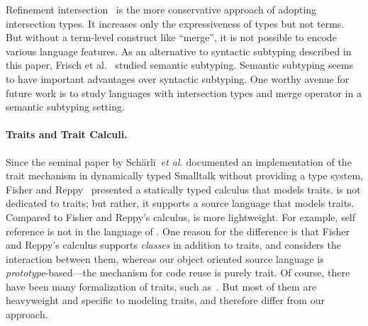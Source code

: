 Refinement
intersection~\cite{dunfield2007refined,davies2005practical,freeman1991refinement}
is the more conservative approach of adopting intersection types. It increases
only the expressiveness of types but not terms. But without a term-level
construct like ``merge'', it is not possible to encode various language
features. As an alternative to syntactic subtyping described in this paper,
Frisch et al.~\cite{frisch2008semantic} studied semantic subtyping. Semantic
subtyping seems to have important advantages over syntactic subtyping. One
worthy avenue for future work is to study languages with intersection types
and merge operator in a semantic subtyping setting.

\paragraph{Traits and Trait Calculi.}

Since the seminal paper by Schärli~\emph{et al.} documented an implementation of
the trait mechanism in dynamically typed Smalltalk without providing a type
system, Fisher and Reppy~\cite{fisher2004typed} presented a statically typed
calculus that models traits. \name is not dedicated to traits; but rather, it
supports a source language that models traits. Compared to Fisher and Reppy's
calculus, \name is more lightweight. For example, self reference is not in the
language of \name. One reason for the difference is that Fisher and Reppy's
calculus supports \emph{classes} in addition to traits, and considers the
interaction between them, whereas our object oriented source language is
\emph{prototype}-based---the mechanism for code reuse is purely trait. Of
course, there have been many formalization of traits, such
as~\cite{scharli2003traitsformal}. But most of them are heavyweight and specific
to modeling traits, and therefore differ from our approach.

